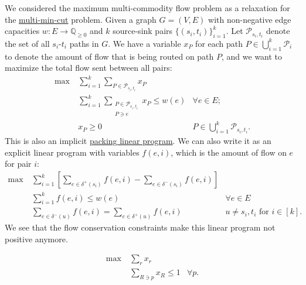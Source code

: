 \begin{eg}
	We considered the maximum multi-commodity flow problem as a relaxation for the \hyperref[prb:multi-min-cut]{multi-min-cut} problem. Given a graph \(G = (V, E)\) with non-negative edge capacities \(w \colon E \to \mathbb{Q} _{\geq 0}\) and \(k\) source-sink pairs \(\{ (s_i, t_i) \} _{i=1}^{k}\). Let \(\mathcal{P} _{s_i, t_i}\) denote the set of all \(s_i\)-\(t_i\) paths in \(G\). We have a variable \(x_P\) for each path \(P \in \bigcup_{i=1}^{k} \mathcal{P} _i\) to denote the amount of flow that is being routed on path \(P\), and we want to maximize the total flow sent between all pairs:
	\[
		\begin{aligned}
			\max~ & \sum_{i=1}^{k} \sum_{P \in \mathcal{P} _{s_i, t_i}} x_P                                                         \\
			      & \sum_{i=1}^{k} \sum_{\substack{P \in\mathcal{P} _{s_i, t_i}                                                     \\ P \ni e}} x_P \leq w(e) & \forall e \in E ;                                  \\
			      & x_P \geq 0                                                  & P \in \bigcup_{i=1}^{k} \mathcal{P} _{s_i, t_i} .
		\end{aligned}
	\]
	This is also an implicit \hyperref[def:packing-LP]{packing linear program}. We can also write it as an explicit linear program with variables \(f(e, i)\), which is the amount of flow on \(e\) for pair \(i\):
	\[
		\begin{aligned}
			\max~ & \sum_{i=1}^{k} \left[ \sum_{e \in \delta ^+ (s_i) } f(e, i) - \sum_{e \in \delta ^- (s_i) } f(e, i) \right]                                           \\
			      & \sum_{i=1}^{k} f(e, i) \leq w(e)                                                                            & \forall e \in E                         \\
			      & \sum_{e \in \delta ^-(u)} f(e, i) = \sum_{e \in \delta ^+(u)} f(e, i)                                       & u \neq s_i, t_i \text{ for } i \in [k].
		\end{aligned}
	\]
	We see that the flow conservation constraints make this linear program not positive anymore.
\end{eg}

\begin{eg}
	\[
		\begin{aligned}
			\max~ & \sum_{r} x_r                            \\
			      & \sum_{R \ni p} x_R \leq 1 & \forall p .
		\end{aligned}
	\]
\end{eg}

